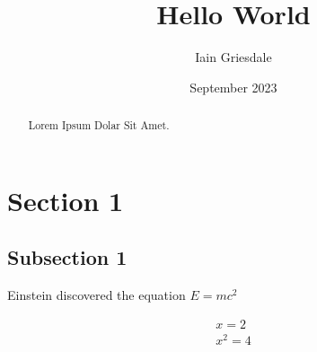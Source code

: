 \documentclass[titlepage]{article}
\title{Hello World}
\author{Iain Griesdale}
\date{September 2023}
\begin{document}
\maketitle

\begin{abstract}
    Lorem Ipsum Dolar Sit Amet.
\end{abstract}

\section{Section 1}

\subsection{Subsection 1}

Einstein discovered the equation $E=mc^2$

\begin{equation} \label{eq1}
    \begin{split}
        x=2 \\
        x^2=4
    \end{split}
\end{equation}
\end{document}
